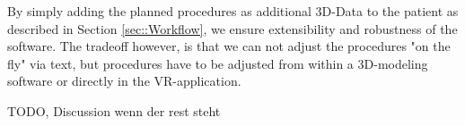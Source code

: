 By simply adding the planned procedures as additional 3D-Data to the patient as described in Section \ref{sec::Workflow}, we ensure extensibility and robustness of the software.
The tradeoff however, is that we can not adjust the procedures "on the fly" via text, but procedures have to be adjusted from within a 3D-modeling software or directly in the VR-application.

TODO, Discussion wenn der rest steht